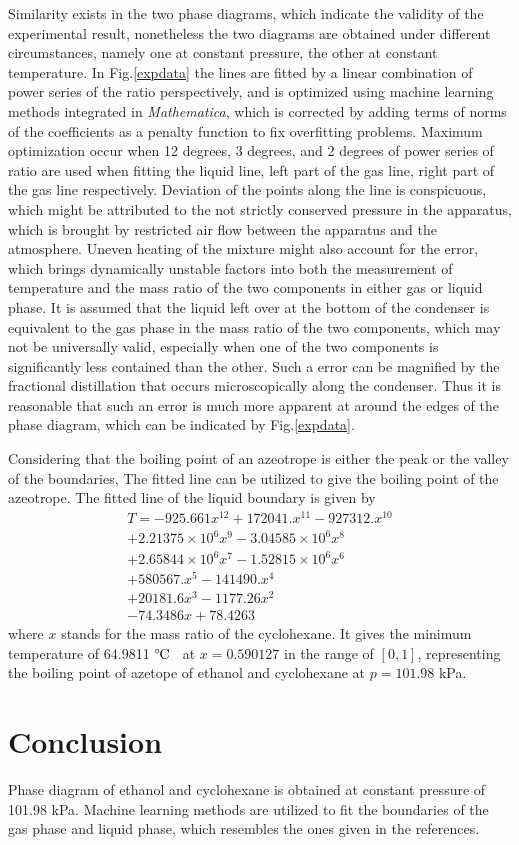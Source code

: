 \documentclass[%
 reprint,
 amsmath,amssymb,
 aps,
10.5pt,
]{revtex4-1}
\newcommand{\celsius}{\ensuremath{^\circ\hspace{-0.09em}\mathrm{C}}}
\begin{document}
 Similarity exists in the two phase diagrams, which indicate the validity of the experimental result, nonetheless the two diagrams are obtained under different circumstances, namely one at constant pressure, the other at constant temperature. In Fig.\ref{expdata} the lines are fitted by a linear combination of power series of the ratio perspectively, and is optimized using machine learning methods integrated in \emph{Mathematica}, which is corrected by adding terms of norms of the coefficients as a penalty function to fix overfitting problems. Maximum optimization occur when 12 degrees, 3 degrees, and 2 degrees of power series of ratio are used when fitting the liquid line, left part of the gas line, right part of the gas line respectively. Deviation of the points along the line is conspicuous, which might be attributed to the not strictly conserved pressure in the apparatus, which is brought by restricted air flow between the apparatus and the atmosphere. Uneven heating of the mixture might also account for the error, which brings dynamically unstable factors into both the measurement of temperature and the mass ratio of the two components in either gas or liquid phase. It is assumed that the liquid left over at the bottom of the condenser is equivalent to the gas phase in the mass ratio of the two components, which may not be universally valid, especially when one of the two components is significantly less contained than the other. Such a error can be magnified by the fractional distillation that occurs microscopically along the condenser. Thus it is reasonable that such an error is much more apparent at around the edges of the phase diagram, which can be indicated by Fig.\ref{expdata}.

 Considering that the boiling point of an azeotrope is either the peak or the valley of the boundaries, The fitted line can be utilized to give the boiling point of the azeotrope. The fitted line of the liquid boundary is given by
 \begin{align*}
 T = -925.661 x^{12}+172041. x^{11}-927312. 
   x^{10} \\+2.21375\times 10^6 x^9-3.04585\times 
   10^6 x^8 \\ +2.65844\times 10^6 x^7-1.52815\times 
   10^6 x^6 \\+580567. x^5-141490. x^4 \\ +20181.6 
   x^3-1177.26 x^2\\-74.3486 x+78.4263
  \end{align*}
  where $x$ stands for the mass ratio of the cyclohexane. It gives the minimum temperature of 64.9811 \celsius~ at $x=0.590127$ in the range of $[0,1]$, representing the boiling point of azetope of ethanol and cyclohexane at $p=101.98$ kPa.

 \section{Conclusion}
 Phase diagram of ethanol and cyclohexane is obtained at constant pressure of 101.98 kPa. Machine learning methods are utilized to fit the boundaries of the gas phase and liquid phase, which resembles the ones given in the references.
\end{document}
